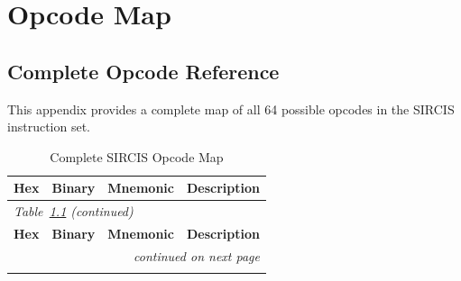 \chapter{Opcode Map}
\label{appendix:opcode-map}

\section{Complete Opcode Reference}

This appendix provides a complete map of all 64 possible opcodes in the SIRCIS instruction set.

\footnotesize
\begin{longtable}{clll}
	\caption{Complete SIRCIS Opcode Map}
	\label{tab:opcode-map}                                                                                        \\
	\toprule
	\textbf{Hex} & \textbf{Binary} & \textbf{Mnemonic} & \textbf{Description}                                     \\
	\midrule
	\endfirsthead

	\multicolumn{4}{l}{\small\textit{Table~\ref{tab:opcode-map} (continued)}}                                     \\
	\toprule
	\textbf{Hex} & \textbf{Binary} & \textbf{Mnemonic} & \textbf{Description}                                     \\
	\midrule
	\endhead

	\midrule
	\multicolumn{4}{r}{\small\textit{continued on next page}}                                                     \\
	\endfoot

	\bottomrule
	\endlastfoot


\end{longtable}
